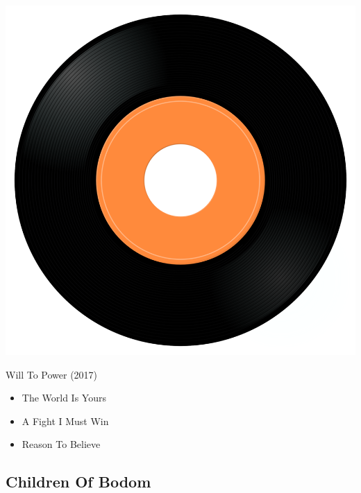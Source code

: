 \begin{minipage}[t]{0.25\textwidth}\vspace{0pt}
\captionsetup{type=figure}
\includegraphics[width=\textwidth]{Images/cover.png}
\caption*{Will To Power (2017)}
\end{minipage}
\begin{minipage}[t]{0.25\textwidth}\vspace{0pt}
\begin{itemize}[nosep,leftmargin=1em,labelwidth=*,align=left]
	\setlength{\itemsep}{0pt}
	\item The World Is Yours
	\item A Fight I Must Win
	\item Reason To Believe
\end{itemize}
\end{minipage}

\subsection{Children Of Bodom}

